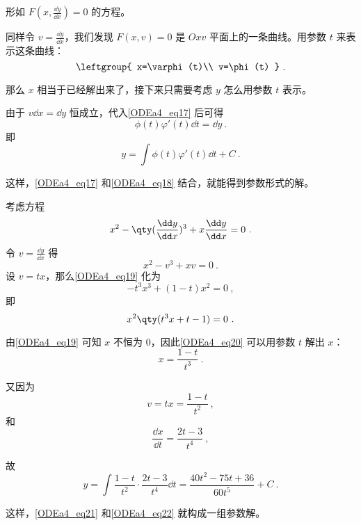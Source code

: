 形如 $F(x, \frac{\dd y}{\dd x})=0$ 的方程。

同样令 $v=\frac{\dd y}{\dd x}$，我们发现 $F(x, v)=0$ 是 $Oxv$ 平面上的一条曲线。用参数 $t$ 来表示这条曲线：
\begin{equation}\label{ODEa4_eq17}
\leftgroup{
    x=\varphi(t)\\
    v=\phi(t)
}~.
\end{equation}

那么 $x$ 相当于已经解出来了，接下来只需要考虑 $y$ 怎么用参数 $t$ 表示。

由于 $v\dd x=\dd y$ 恒成立，代入\autoref{ODEa4_eq17} 后可得
\begin{equation}
\phi(t)\varphi'(t)\dd t=\dd y~.
\end{equation}
即
\begin{equation}\label{ODEa4_eq18}
y=\int \phi(t)\varphi'(t)\dd t+C~.
\end{equation}

这样，\autoref{ODEa4_eq17} 和\autoref{ODEa4_eq18} 结合，就能得到参数形式的解。

\begin{example}{}
考虑方程
\begin{equation}
x^2-\qty(\frac{\dd y}{\dd x})^3+x\frac{\dd y}{\dd x}=0~.
\end{equation}
令 $v=\frac{\dd y}{\dd x}$ 得
\begin{equation}\label{ODEa4_eq19}
x^2-v^3+xv=0~.
\end{equation}
设 $v=tx$，那么\autoref{ODEa4_eq19} 化为
\begin{equation}
-t^3x^3+(1-t)x^2=0~,
\end{equation}
即
\begin{equation}\label{ODEa4_eq20}
x^2\qty(t^3x+t-1)=0~.
\end{equation}

由\autoref{ODEa4_eq19} 可知 $x$ 不恒为 $0$，因此\autoref{ODEa4_eq20} 可以用参数 $t$ 解出 $x$：
\begin{equation}\label{ODEa4_eq21}
x=\frac{1-t}{t^3}~.
\end{equation}

又因为
\begin{equation}
v=tx=\frac{1-t}{t^2}~,
\end{equation}
和
\begin{equation}
\frac{\dd x}{\dd t}=\frac{2t-3}{t^4}~,
\end{equation}

故
\begin{equation}\label{ODEa4_eq22}
y=\int \frac{1-t}{t^2}\cdot\frac{2t-3}{t^4}\dd t=\frac{40t^2-75t+36}{60t^5}+C~.
\end{equation}

这样，\autoref{ODEa4_eq21} 和\autoref{ODEa4_eq22} 就构成一组参数解。



\end{example}



